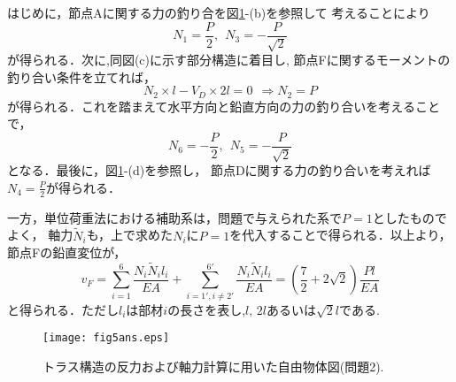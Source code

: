 \documentclass[10pt,a4j]{jarticle}
\begin{document}
はじめに，節点Aに関する力の釣り合を図\ref{fig:fig5}-(b)を参照して
考えることにより
\[
	N_1=\frac{P}{2}, \ \ N_3=-\frac{P}{\sqrt{2}}
\]
が得られる．次に,同図(c)に示す部分構造に着目し,
節点Fに関するモーメントの釣り合い条件を立てれば，
\[
	N_2\times l -V_D\times 2l=0 \ \ \Rightarrow N_2=P 
\]
が得られる．これを踏まえて水平方向と鉛直方向の力の釣り合いを考えることで，
\[
	N_6=-\frac{P}{2}, \ \ N_5=-\frac{P}{\sqrt{2}}
\]
となる．最後に，図\ref{fig:fig5}-(d)を参照し，
節点Dに関する力の釣り合いを考えれば$N_4=\frac{P}{2}$が得られる．

一方，単位荷重法における補助系は，問題で与えられた系で$P=1$としたものでよく，
軸力$\tilde N_i$も，上で求めた$N_i$に$P=1$を代入することで得られる．以上より，
節点Fの鉛直変位が，
\[
	v_F=
	\sum_{i=1}^6\frac{N_i\tilde N_il_i}{EA}
	+
	\sum_{i=1',i\neq 2'}^{6'}\frac{N_i\tilde N_il_i}{EA}
	=\left(\frac{7}{2}+2\sqrt{2}\right)\frac{Pl}{EA}
\]
と得られる．ただし$l_i$は部材$i$の長さを表し,$l,\,2l$あるいは$\sqrt{2}l$である.
\begin{figure}[h]
	\begin{center}
	\texttt{[image: fig5ans.eps]} 
	\end{center}
	\caption{トラス構造の反力および軸力計算に用いた自由物体図(問題2).}
	\label{fig:fig5}
\end{figure}
\end{document}
